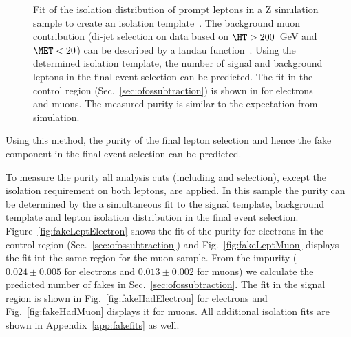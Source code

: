 \begin{figure}[hbtp]
  \hfill
  \hfill
  \hfill
  \hfill
  \hfill
  \hfill
  
  \caption{Fit of the isolation distribution of prompt leptons in a Z simulation sample to create an isolation
    template~. The background muon contribution (di-jet selection on data based on $\HT > 200$~GeV and $\MET < 20$) can be described by a landau
    function~. Using the determined isolation template, the number of signal and background leptons in
    the final event selection can be predicted. The fit in the control region (Sec.~\ref{sec:ofossubtraction}) is shown in  for electrons and  muons. The measured purity is similar to the expectation from simulation.} %
\end{figure}

Using this method, the purity of the final lepton selection and hence the fake component in the final event selection can be predicted. 

To measure the purity all analysis cuts (including \HT and \MET selection), except the isolation requirement on both leptons,
are applied. In this sample the purity can be determined by the a simultaneous fit to the signal template, background template and lepton isolation distribution in the final event selection.
Figure~\ref{fig:fakeLeptElectron} shows the fit of the purity for electrons in the control region (Sec.~\ref{sec:ofossubtraction}) and Fig.~\ref{fig:fakeLeptMuon} displays the fit int the same region for the muon sample.
From the impurity ($0.024\pm0.005$ for electrons and $0.013\pm0.002$ for muons) we calculate the predicted 
number of fakes in Sec.~\ref{sec:ofossubtraction}.
The fit in the signal region is shown in Fig.~\ref{fig:fakeHadElectron} for electrons
and Fig.~\ref{fig:fakeHadMuon} displays it for muons.
All additional isolation fits are shown in Appendix~\ref{app:fakefits} as well.

